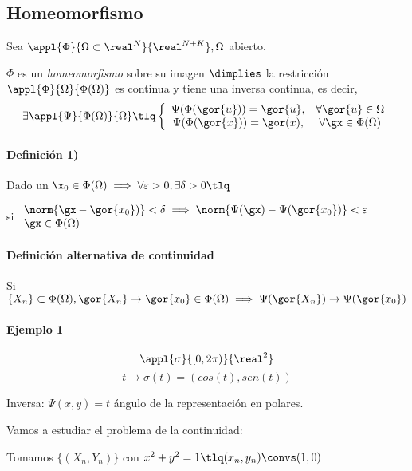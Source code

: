 \subsection{Homeomorfismo}
\begin{defn}[Homeomorfismo]
Sea $\appl{\Phi}{\Omega\subset\real^N}{\real^{N+K}}, \Omega$ abierto.

$\Phi$ es un \emph{homeomorfismo} sobre su imagen $\dimplies $ la restricción $\appl{\Phi}{\Omega}{\Phi(\Omega)}$ es continua y tiene una inversa continua,
es decir, \[\exists \appl{\Psi}{\Phi(\Omega)}{\Omega} \tlq 
\left\{ \begin{array}{cc} 
\Psi(\Phi(\gor{u})) = \gor{u}, &\forall \gor{u} \in \Omega\\ 
\Psi(\Phi(\gor{x})) = \gor(x), &\forall \gx \in \Phi(\Omega)
\end{array}\right.\]

\paragraph{Definición 1)}
Dado un $\displaystyle \x_0 \in \Phi(\Omega) \implies \forall \varepsilon >0, \exists \delta>0 \tlq$ 

si $\begin{array}{lc}
\norm{\gx-\gor{x_0})} < \delta \implies \norm{\Psi(\gx)-\Psi(\gor{x_0})}<\varepsilon\\
\gx \in \Phi(\Omega)
\end{array}$

\paragraph{Definición alternativa de continuidad}
Si $\{X_n\}\subset\Phi(\Omega), \gor{X_n} \rightarrow \gor{x_0}\in\Phi(\Omega) \implies \Psi(\gor{X_n}) \rightarrow \Psi(\gor{x_0})$

\end{defn}

\paragraph{Ejemplo 1}

\[\appl{\sigma}{[0,2\pi)}{\real^2}\]
\[t \rightarrow \sigma(t) = (cos(t),sen(t))\]

Inversa: $\Psi(x,y) = t$ ángulo de la representación en polares.

Vamos a estudiar el problema de la continuidad:

Tomamos $\{(X_n,Y_n)\}$ con $x^2+y^2 = 1 \tlq (x_n,y_n) \convs (1,0)$

